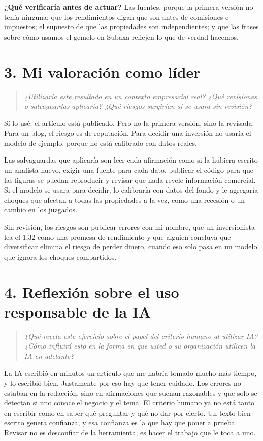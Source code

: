 \documentclass[11pt,letterpaper]{article}
\newcommand{\pregunta}[1]{%
  \begin{quote}\color{cGris}\small\itshape #1\end{quote}}
\begin{document}
\textbf{¿Qué verificaría antes de actuar?} Las fuentes, porque la primera
versión no tenía ninguna; que los rendimientos digan que son antes de
comisiones e impuestos; el supuesto de que las propiedades son
independientes; y que las frases sobre cómo usamos el gemelo en Subaxa
reflejen lo que de verdad hacemos.

\section*{3. Mi valoración como líder}

\pregunta{¿Utilizaría este resultado en un contexto empresarial real? ¿Qué
revisiones o salvaguardas aplicaría? ¿Qué riesgos surgirían si se usara sin
revisión?}

Sí lo usé: el artículo está publicado. Pero no la primera versión, sino la
revisada. Para un blog, el riesgo es de reputación. Para decidir una
inversión no usaría el modelo de ejemplo, porque no está calibrado con datos
reales.

Las salvaguardas que aplicaría son leer cada afirmación como si la hubiera
escrito un analista nuevo, exigir una fuente para cada dato, publicar el
código para que las figuras se puedan reproducir y revisar que nada revele
información comercial. Si el modelo se usara para decidir, lo calibraría con
datos del fondo y le agregaría choques que afectan a todas las propiedades
a la vez, como una recesión o un cambio en los juzgados.

Sin revisión, los riesgos son publicar errores con mi nombre, que un
inversionista lea el 1,32 como una promesa de rendimiento y que alguien
concluya que diversificar elimina el riesgo de perder dinero, cuando eso solo
pasa en un modelo que ignora los choques compartidos.

\section*{4. Reflexión sobre el uso responsable de la IA}

\pregunta{¿Qué revela este ejercicio sobre el papel del criterio humano al
utilizar IA? ¿Cómo influirá esto en la forma en que usted o su organización
utilicen la IA en adelante?}

La IA escribió en minutos un artículo que me habría tomado mucho más tiempo,
y lo escribió bien. Justamente por eso hay que tener cuidado. Los errores no
estaban en la redacción, sino en afirmaciones que suenan razonables y que
solo se detectan si uno conoce el negocio y el tema. El criterio humano ya
no está tanto en escribir como en saber qué preguntar y qué no dar por
cierto. Un texto bien escrito genera confianza, y esa confianza es la que
hay que poner a prueba. Revisar no es desconfiar de la herramienta, es hacer
el trabajo que le toca a uno.
\end{document}
